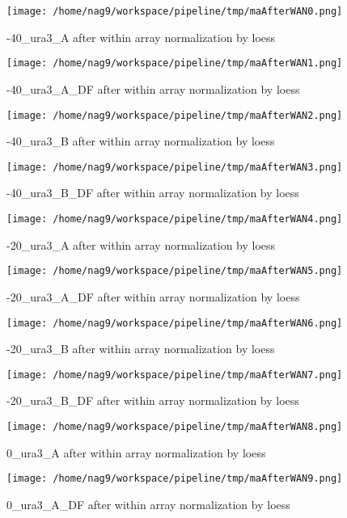 \documentclass[titlepage]{article}
\begin{document}
\begin{figure}[htb!]
\centering\texttt{[image: /home/nag9/workspace/pipeline/tmp/maAfterWAN0.png]}
\caption{-40\_ura3\_A after within array normalization by loess}
 \end{figure}\pagebreak
\begin{figure}[htb!]
\centering\texttt{[image: /home/nag9/workspace/pipeline/tmp/maAfterWAN1.png]}
\caption{-40\_ura3\_A\_DF after within array normalization by loess}
 \end{figure}\pagebreak
\begin{figure}[htb!]
\centering\texttt{[image: /home/nag9/workspace/pipeline/tmp/maAfterWAN2.png]}
\caption{-40\_ura3\_B after within array normalization by loess}
 \end{figure}\pagebreak
\begin{figure}[htb!]
\centering\texttt{[image: /home/nag9/workspace/pipeline/tmp/maAfterWAN3.png]}
\caption{-40\_ura3\_B\_DF after within array normalization by loess}
 \end{figure}\pagebreak
\begin{figure}[htb!]
\centering\texttt{[image: /home/nag9/workspace/pipeline/tmp/maAfterWAN4.png]}
\caption{-20\_ura3\_A after within array normalization by loess}
 \end{figure}\pagebreak
\begin{figure}[htb!]
\centering\texttt{[image: /home/nag9/workspace/pipeline/tmp/maAfterWAN5.png]}
\caption{-20\_ura3\_A\_DF after within array normalization by loess}
 \end{figure}\pagebreak
\begin{figure}[htb!]
\centering\texttt{[image: /home/nag9/workspace/pipeline/tmp/maAfterWAN6.png]}
\caption{-20\_ura3\_B after within array normalization by loess}
 \end{figure}\pagebreak
\begin{figure}[htb!]
\centering\texttt{[image: /home/nag9/workspace/pipeline/tmp/maAfterWAN7.png]}
\caption{-20\_ura3\_B\_DF after within array normalization by loess}
 \end{figure}\pagebreak
\begin{figure}[htb!]
\centering\texttt{[image: /home/nag9/workspace/pipeline/tmp/maAfterWAN8.png]}
\caption{0\_ura3\_A after within array normalization by loess}
 \end{figure}\pagebreak
\begin{figure}[htb!]
\centering\texttt{[image: /home/nag9/workspace/pipeline/tmp/maAfterWAN9.png]}
\caption{0\_ura3\_A\_DF after within array normalization by loess}
 \end{figure}\pagebreak
\end{document}
